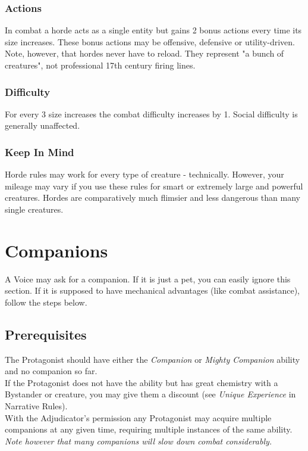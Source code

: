 \documentclass[12pt,a4paper,openany,usenames,dvipsnames]{book}
\begin{document}
	\subsection*{Actions}
	In combat a horde acts as a single entity but gains 2 bonus actions every time its size increases. These bonus actions may be offensive, defensive or utility-driven. \\
	Note, however, that hordes never have to reload. They represent "a bunch of creatures", not professional 17th century firing lines.
	
	\subsection*{Difficulty}
	For every 3 size increases the combat difficulty increases by 1. Social difficulty is generally unaffected.
	
	\begin{exampleblock}
	\subsection*{Keep In Mind}
		Horde rules may work for every type of creature - technically.
		However, your mileage may vary
		if you use these rules for smart or extremely large and powerful creatures.
		Hordes are comparatively much flimsier and less dangerous than many single creatures.
	\end{exampleblock}
	
	
	\chapter{Companions}
	A Voice may ask for a companion.
	If it is just a pet, you can easily ignore this section.
	If it is supposed to have mechanical advantages (like combat assistance),
		follow the steps below.
	\section{Prerequisites}
	The Protagonist should have either
		the \textit{Companion} or \textit{Mighty Companion} ability
		and no companion so far.
	\\%
	If the Protagonist does not have the ability
		but has great chemistry with a Bystander or creature,
		you may give them a discount (see \textit{Unique Experience} in Narrative Rules).\\
	With the Adjudicator's permission any Protagonist may acquire multiple companions at any given time,
		requiring multiple instances of the same ability.
	\textit{Note however that many companions will slow down combat considerably.}
\end{document}
